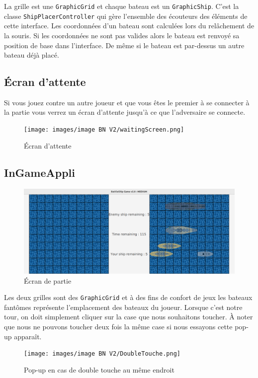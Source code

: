 \documentclass[12pt]{article}
\begin{document}
La grille est une \texttt{GraphicGrid} et chaque bateau est un
\texttt{GraphicShip}. C'est la classe \texttt{ShipPlacerController} qui gère
l'ensemble des écouteurs des éléments de cette interface. Les coordonnées d'un
bateau sont calculées lors du relâchement de la souris. Si les coordonnées ne
sont pas valides alors le bateau est renvoyé sa position de base dans
l'interface. De même si le bateau est par-dessus un autre bateau déjà placé.

\bigskip

\subsection{Écran d'attente}

Si vous jouez contre un autre joueur et que vous êtes le premier à se connecter
à la partie vous verrez un écran d'attente jusqu'à ce que l'adversaire se
connecte.
\begin{figure}[H]
      \centering
      \texttt{[image: images/image BN
            V2/waitingScreen.png]}
      \caption{Écran d'attente}
\end{figure}

\subsection{InGameAppli}
\begin{figure}[H]
      \centering
      \includegraphics[width=\textwidth]{images/image BN V2/InGameAppli.png}
      \caption{Écran de partie}
\end{figure}

Les deux grilles sont des \texttt{GraphicGrid} et à des fins de confort de jeux
les bateaux fantômes représente l'emplacement des bateaux du joueur. Lorsque
c'est notre tour, on doit simplement cliquer sur la case que nous souhaitons
toucher. À noter que nous ne pouvons toucher deux fois la même case si nous
essayons cette pop-up apparaît.
\begin{figure}[H]
      \centering
      \texttt{[image: images/image BN
            V2/DoubleTouche.png]}
      \caption{Pop-up en cas de double touche au même endroit}
\end{figure}
\end{document}
